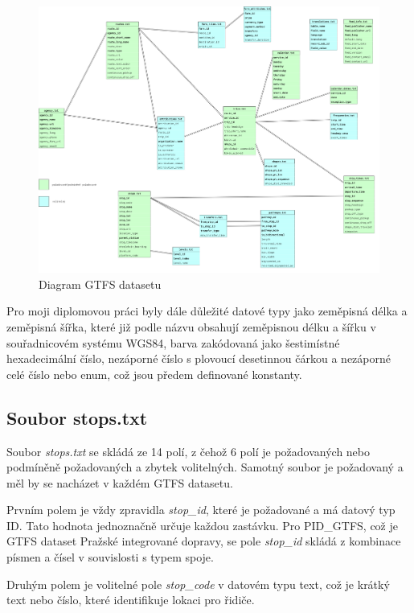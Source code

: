 \begin{figure}[H] \centering
    \includegraphics[width=400pt]{./pictures/GTFS-diagram.PNG}
    \caption[Diagram GTFS datasetu]{Diagram GTFS datasetu}
	\label{fig:GTFS-diagram}              
\end{figure}

Pro moji diplomovou práci byly dále důležité datové typy jako zeměpisná délka a zeměpisná šířka,
které již podle názvu obsahují zeměpisnou délku a šířku v souřadnicovém systému WGS84, barva zakódovaná 
jako šestimístné hexadecimální číslo, nezáporné číslo s plovoucí desetinnou čárkou a nezáporné celé číslo
nebo enum, což jsou předem definované konstanty.

\subsection{Soubor stops.txt}
\label{stops.txt}
Soubor \textit{stops.txt} se skládá ze 14 polí, z čehož 6 polí je požadovaných nebo podmíněně požadovaných 
a zbytek volitelných. Samotný soubor je požadovaný a měl by se nacházet v každém GTFS datasetu.

Prvním polem je vždy zpravidla \textit{stop\_id}, které je požadované a má datový typ ID.
Tato hodnota jednoznačně určuje každou zastávku. Pro PID\_GTFS, což je GTFS dataset Pražské integrované dopravy,
se pole \textit{stop\_id} skládá z kombinace písmen a čísel v souvislosti s typem spoje.

Druhým polem je volitelné pole \textit{stop\_code} v datovém typu text, což je krátký text nebo číslo, 
které identifikuje lokaci pro řidiče. 

